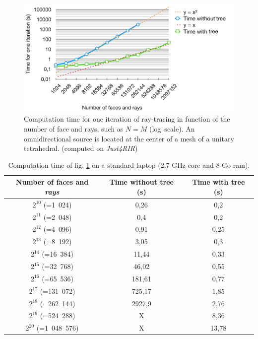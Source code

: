 \documentclass[AMA,STIX1COL]{WileyNJD-v2}
\begin{document}
\begin{figure}[t]
\centering
	\includegraphics[width=0.8\linewidth]{times}
	\caption{Computation time for one iteration of ray-tracing in function of the number of face and rays, such as $N = M$ (log~scale). An omnidirectional source is located at the center of a mesh of a unitary tetrahedral. (computed on \textit{Just4RIR})}
	\label{times}
\end{figure}
%
\begin{table}[t]
\centering
	\begin{tabular}{| c | c | c |}
		\hline
		Number of faces and \textit{rays} & Time \textbf{without} tree (s) & Time \textbf{with} tree (s)\\
		  \hline
		  \hline
		   $2^{10}$ (=1~024) & 0,26 &	0,2 \\
		   \hline
		$2^{11}$ (=2~048)  & 0,4	& 0,2 \\
		   \hline
		$2^{12}$ (=4~096) & 0,91	& 0,25\\
		   \hline
		$2^{13}$ (=8~192) & 3,05 &	0,3\\
		   \hline
		$2^{14}$ (=16~384) & 11,44	&0,33\\
		   \hline
		$2^{15}$ (=32~768) & 46,02	&0,55 \\
		     \hline
		    $2^{16}$ (=65~536) & 181,61	& 0,77\\
		   \hline
		$2^{17}$ (=131~072) & 725,17	& 1,85\\
		\hline
		$2^{18}$ (=262~144) & 2927,9 & 2,76 \\
		\hline
		$2^{19}$ (=524~288) & X & 8,36 \\
		\hline
		$2^{20}$ (=1~048~576) & X & 13,78 \\
		\hline
	 \end{tabular}
	\caption{Computation time of fig. \ref{times} on a standard laptop (2.7 GHz core and 8 Go ram).}
	\label{tabComplexite}
\end{table}
\end{document}
